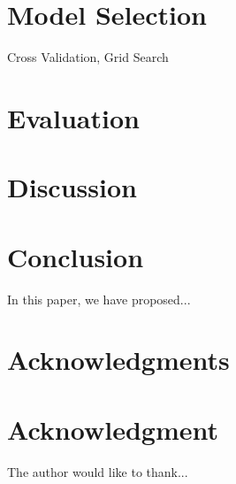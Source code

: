 \documentclass[10pt,journal,compsoc]{IEEEtran}
\begin{document}
\section{Model Selection}
\label{sec:model_selection}
Cross Validation, Grid Search

\section{Evaluation}
\label{sec:evaluation}

\section{Discussion}
\label{sec:discussion}

\section{Conclusion}
\label{sec:conclusion}

In this paper\cite{zhang2018dynamic}, we have proposed...


\ifCLASSOPTIONcompsoc
  \section*{Acknowledgments}
\else
  \section*{Acknowledgment}
\fi


The author would like to thank...


\ifCLASSOPTIONcaptionsoff
  \newpage
\fi




\end{document}
